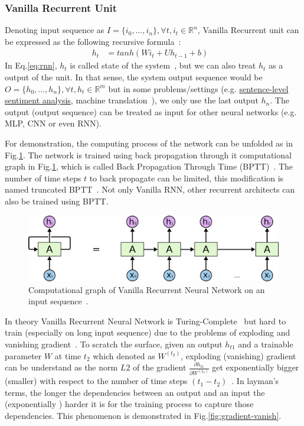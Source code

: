 \subsubsection{Vanilla Recurrent Unit}\label{sec:vanilla-rnn}
Denoting input sequence as \(I = \{i_0,\ldots,i_n\}, \forall t, i_t \in \mathbb{R}^n\), Vanilla Recurrent unit can be expressed as the following recursive formula~\cite{treeLSTM}:
\begin{align}
      h_t &= tanh(Wi_t + Uh_{t-1} + b)&\label{eq:rnn}
\end{align}
In Eq.\ref{eq:rnn}, \(h_t\) is called state of the system~\cite{deeplearning-book}, but we can also treat \(h_t\) as a output of the unit.  
In that sense, the system output sequence would be \(O = \{h_0,\ldots,h_n\}, \forall t, h_t \in \mathbb{R}^m\) but in some problems/settings (e.g. \hyperref[sec:sent-level]{sentence-level sentiment analysis}, machine translation~\cite{SutskeverVL14}), we only use the last output \(h_n\).
The output (output sequence) can be treated as input for other neural networks (e.g. MLP, CNN or even RNN).
 
For demonstration, the computing process of the network can be unfolded as in Fig.\ref{fig:rnn-unfold}. 
The network is trained using back propagation through it computational graph in Fig.\ref{fig:rnn-unfold}, which is called Back Propagation Through Time (BPTT)~\cite{BPTT}. 
The number of time steps \(t\) to back propagate can be limited, this modification is named truncated BPTT~\cite{truncatedBPTT}. 
Not only Vanilla RNN, other recurrent architects can also be trained using BPTT.

\begin{figure}[H]
    \centering
    \includegraphics[scale=0.4]{figure/rnn-unroll}
    \caption{Computational graph of Vanilla Recurrent Neural Network on an input sequence~\cite{colah-lsmt}.}
    \label{fig:rnn-unfold}
\end{figure}
\label{sec:gradient-vanish}
In theory Vanilla Recurrent Neural Network is Turing-Complete~\cite{rnn-turing-complete} but  hard to train (especially on long input sequence) due to the problems of exploding and vanishing gradient~\cite{Bengio1994}. 
To scratch the surface, given an output \(h_{t1}\) and a trainable parameter \(W\) at time \(t_2\) which denoted as \(W^{(t_2)}\),  exploding (vanishing) gradient can be understand as the norm \(L2\) of the gradient \(\frac{\partial h_{t1}}{\partial W^{(t_2)}}\) get exponentially bigger (smaller) with respect to the number of time steps \((t_1-t_2)\)~\cite{Bengio1994}.
In layman's terms, the longer the dependencies between an output and an input the (exponentially ) harder it is for the training process to capture those dependencies.
This phenomenon is demonstrated in Fig.\ref{fig:gradient-vanish}. 


